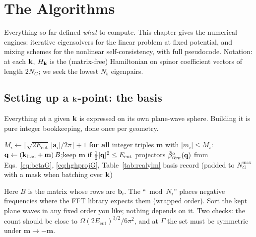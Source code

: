 \chapter{The Algorithms}
\label{ch:algorithms}

Everything so far defined \emph{what} to compute. This chapter gives the
numerical engines: iterative eigensolvers for the linear problem at fixed
potential, and mixing schemes for the nonlinear self-consistency, with full
pseudocode. Notation: at each $\kk$, $H_{\mathbf{k}}$ is the (matrix-free)
Hamiltonian on spinor coefficient vectors of length $2N_G$; we seek the
lowest $N_b$ eigenpairs.

\section{Setting up a \texorpdfstring{$\kk$}{k}-point: the basis}
\label{sec:setup}

Everything at a given $\kk$ is expressed on its own plane-wave sphere.
Building it is pure integer bookkeeping, done once per geometry.

\begin{algorithm}[H]
\caption{Plane-wave basis and projectors at one $\kk$-point}
\label{alg:basis}
\begin{algorithmic}[1]
\State $M_i \gets \big\lceil \sqrt{2E_{\mathrm{cut}}}\,|\mathbf a_i|/2\pi
\big\rceil + 1$ 
\State \textbf{for all} integer triples $\mathbf m$ with $|m_i|\le M_i$:
$\mathbf{q} \gets (\mathbf{k}_{\mathrm{frac}} + \mathbf m)\,B$;\quad keep $\mathbf m$ if
$\tfrac12|\mathbf{q}|^2 \le E_{\mathrm{cut}}$
\State projectors $\tilde\beta^{a}_{i\ell m}(\mathbf{q})$ from
Eqs.~\eqref{eq:betaG}, \eqref{eq:hghprojG}, Table~\ref{tab:realylm}
\State \Return basis record (padded to $N_G^{\max}$ with a mask when
batching over $\kk$)
\EndFunction
\end{algorithmic}
\end{algorithm}

Here $B$ is the matrix whose rows are $\mathbf b_i$. The ``$\bmod N_i$''
places negative frequencies where the FFT library expects them (wrapped
order). Sort the kept plane waves in any fixed order you like; nothing
depends on it. Two checks: the count should be close to
$\Omega(2E_{\mathrm{cut}})^{3/2}/6\pi^2$, and at $\Gamma$ the set must be
symmetric under $\mathbf m\to-\mathbf m$.

